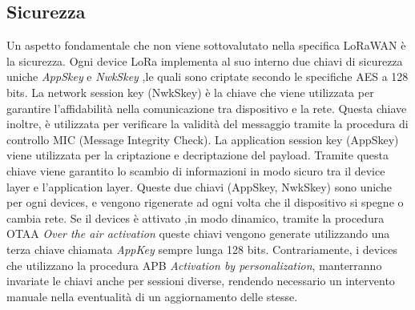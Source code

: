 \subsection{Sicurezza }
Un aspetto fondamentale che non viene sottovalutato nella specifica LoRaWAN è la
sicurezza. Ogni device LoRa implementa al suo interno due chiavi di sicurezza
uniche \emph{AppSkey} e \emph{NwkSkey} ,le quali sono criptate secondo le
specifiche AES a 128 bits.
La network session key (NwkSkey) è la chiave che viene utilizzata per garantire
l'affidabilità nella comunicazione tra dispositivo e la rete. Questa chiave
inoltre, è utilizzata per verificare la validità del messaggio tramite la
procedura di controllo MIC (Message Integrity Check). 
La application session key (AppSkey) viene utilizzata per la criptazione e
decriptazione del payload. Tramite questa chiave viene garantito lo scambio di informazioni 
in modo sicuro tra il device layer e l'application layer. 
Queste due chiavi (AppSkey, NwkSkey) sono uniche per ogni devices, e vengono
rigenerate ad ogni volta che il dispositivo si spegne o cambia rete. 
Se il devices è attivato ,in modo dinamico, tramite
la procedura OTAA \emph{Over the air activation} queste chiavi vengono
generate utilizzando una terza chiave chiamata \emph{AppKey} sempre lunga
128 bits. Contrariamente, i devices che utilizzano la procedura APB
\emph{Activation by personalization}, manterranno invariate le chiavi anche per
sessioni diverse, rendendo necessario un intervento manuale nella eventualità di
un aggiornamento delle stesse.

